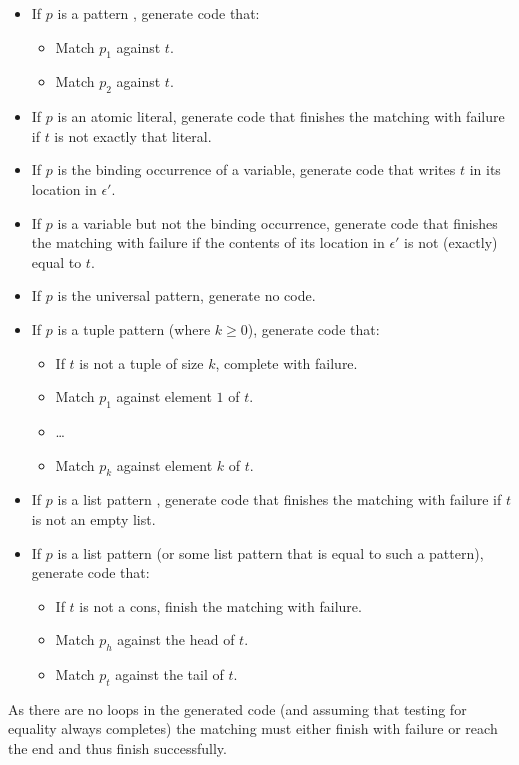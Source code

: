 \begin{itemize}
\item If $p$ is a pattern , generate code that:
\begin{itemize}
\item Match $p_1$ against $t$.
\item Match $p_2$ against $t$.
\end{itemize}
\item If $p$ is an atomic literal, generate code that finishes the matching with failure
if $t$ is not exactly that literal.
\item If $p$ is the binding occurrence of a variable, generate code that
writes $t$ in its location in $\epsilon'$.
\item If $p$ is a variable but not the binding occurrence, generate code that
finishes the matching with failure if the contents of its location in $\epsilon'$ is
not (exactly) equal to $t$.
\item If $p$ is the universal pattern, generate no code.
\item If $p$ is a tuple pattern  (where $k\geq 0$),
generate code that:
\begin{itemize}
\item If $t$ is not a tuple of size $k$, complete with failure.
\item Match $p_1$ against element $1$ of $t$.
\item[] \ldots
\item Match $p_k$ against element $k$ of $t$.
\end{itemize}
\item If $p$ is a list pattern \T{[]}, generate code that finishes the matching
with failure if $t$ is not an empty list.
\item If $p$ is a list pattern \T{[$p_h$|$p_t$]} (or some list pattern that
is equal to such a pattern), generate code that:
\begin{itemize}
\item If $t$ is not a cons, finish the matching with failure.
\item Match $p_h$ against the head of $t$.
\item Match $p_t$ against the tail of $t$.
\end{itemize}
\end{itemize}

As there are no loops in the generated code (and assuming that testing
for equality always completes) the matching must either finish with
failure or reach the end and thus finish successfully.

